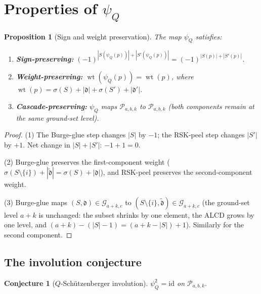\documentclass[11pt]{article}
\DeclareMathOperator{\wt}{wt}
\theoremstyle{plain}
\newtheorem{conjecture}[theorem]{Conjecture}
\newtheorem{proposition}[theorem]{Proposition}
\theoremstyle{definition}
\begin{document}
\section{Properties of $\psi_Q$}
\label{sec:properties}

\begin{proposition}[Sign and weight preservation]
\label{prop:sign-weight-psi}
The map $\psi_Q$ satisfies:
\begin{enumerate}
  \item \textbf{Sign-preserving:}\;
    $(-1)^{|S(\psi_Q(p))| + |S'(\psi_Q(p))|}
    = (-1)^{|S(p)| + |S'(p)|}$.
  \item \textbf{Weight-preserving:}\;
    $\wt(\psi_Q(p)) = \wt(p)$, where
    $\wt(p) = \sigma(S) + |\mathfrak{d}| + \sigma(S')
    + |\mathfrak{d}'|$.
  \item \textbf{Cascade-preserving:}\;
    $\psi_Q$ maps $\mathcal{P}_{a,b,k}$ to
    $\mathcal{P}_{a,b,k}$ (both components remain at the
    same ground-set level).
\end{enumerate}
\end{proposition}

\begin{proof}
(1) The Burge-glue step changes $|S|$ by $-1$; the RSK-peel
step changes $|S'|$ by $+1$.  Net change in $|S| + |S'|$:
$-1 + 1 = 0$.

(2) Burge-glue preserves the first-component weight
($\sigma(S \setminus \{i\}) + |\tilde{\mathfrak{d}}|
= \sigma(S) + |\mathfrak{d}|$), and RSK-peel preserves the
second-component weight.

(3) Burge-glue maps
$(S, \mathfrak{d}) \in \mathcal{G}_{a+k,c}$ to
$(S \setminus \{i\}, \tilde{\mathfrak{d}})
\in \mathcal{G}_{a+k,c}$ (the ground-set level $a + k$ is
unchanged: the subset shrinks by one element, the ALCD grows
by one level, and $(a+k) - (|S|-1) = (a+k-|S|) + 1$).
Similarly for the second component.
\end{proof}


\subsection{The involution conjecture}

\begin{conjecture}[$Q$-Sch\"utzenberger involution]
\label{conj:psi-involution}
$\psi_Q^2 = \mathrm{id}$ on $\mathcal{P}_{a,b,k}$.
\end{conjecture}
\end{document}
